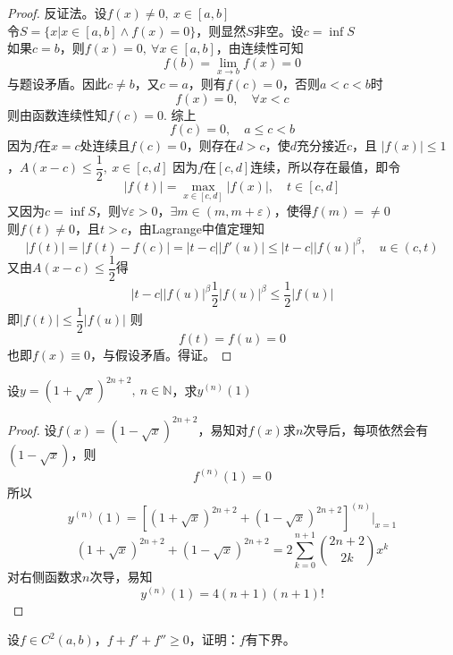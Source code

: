 \begin{proof}

    反证法。设$f(x) \neq 0,\ x \in [a,b]$\\
    令$S = \{x | x \in [a,b] \land f(x) = 0\}$，则显然$S$非空。设$ c = \inf{S}$\\
    如果$c= b$，则$f(x) = 0, \ \forall x \in [a,b]$，由连续性可知
    $$f(b) = \lim_{x\to b}{f(x)} = 0$$
    与题设矛盾。因此$c \neq b$，又$c =a $，则有$f(c) = 0$，否则$a<c<b$时
    $$f(x) = 0, \quad \forall x < c$$
    则由函数连续性知$f(c) = 0$. 综上
    $$f(c) = 0, \quad a \leq c < b$$
    因为$f$在$x = c$处连续且$f(c) = 0$，则存在$d > c$，使$d$充分接近$c$，且
    $|f(x)| \leq 1$，$A(x - c) \leq \dfrac{1}{2}, \ x \in [c,d]$
    因为$f$在$[c,d]$连续，所以存在最值，即令
    $$ |f(t)| = \max_{x\in[c,d]}{|f(x)|}, \quad t \in [c,d]$$
    又因为$c = \inf{S}$，则$\forall \varepsilon > 0$，$\exists m \in (m, m+\varepsilon)$，使得$f(m) = \neq 0$\\
    则$f(t) \neq 0$，且$t > c$，由\textup{Lagrange}中值定理知
    $$| f(t)| = |f(t) - f(c)| = |t-c||f'(u)| \leq |t-c||f(u)|^{\beta}, \quad u \in (c,t)$$
    又由$A(x-c) \leq \dfrac{1}{2}$得
    $$|t-c||f(u)|^{\beta} \dfrac{1}{2}|f(u)|^{\beta} \leq \dfrac{1}{2} |f(u)|$$
    即$|f(t)| \leq \dfrac{1}{2}|f(u)|$
    则
    $$f(t) = f(u) = 0$$
    也即$f(x) \equiv 0$，与假设矛盾。得证。

\end{proof}

\begin{proposition}
    
    设$y = (1 + \sqrt{x})^{2n+2},\ n \in \mathbb{N}$，求$y^{(n)}(1)$

\end{proposition}

\begin{proof}

    设$f(x) = (1 - \sqrt{x})^{2n+2}$，易知对$f(x)$求$n$次导后，每项依然会有$(1 - \sqrt{x})$，则
    $$f^{(n)}(1) = 0$$
    所以
    $$y^{(n)}(1) = \left[(1 + \sqrt{x})^{2n+2} + (1 - \sqrt{x})^{2n+2}\right]^{(n)}\Big|_{x=1}$$
    $$ (1 + \sqrt{x})^{2n+2} + (1 - \sqrt{x})^{2n+2} = 2 \sum_{k=0}^{n+1}{\binom{2n+2}{2k}x^k}$$
    对右侧函数求$n$次导，易知
    $$y^{(n)}(1) = 4(n+1)(n+1)!$$

\end{proof}

\begin{proposition}
    
    设$f \in C^2(a,b)$，$f + f' + f'' \geq 0$，证明：$f$有下界。

\end{proposition}

